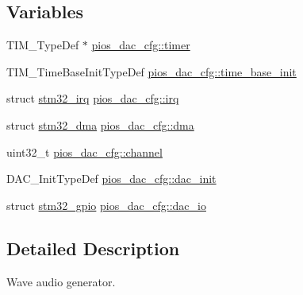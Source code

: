 \subsection*{\-Variables}
\begin{DoxyCompactItemize}
\item 
\-T\-I\-M\-\_\-\-Type\-Def $\ast$ \hyperlink{group___p_i_o_s___w_a_v_p_l_a_y_ga06b2a838489fd6bb8f48615002e024d8}{pios\-\_\-dac\-\_\-cfg\-::timer}
\item 
\-T\-I\-M\-\_\-\-Time\-Base\-Init\-Type\-Def \hyperlink{group___p_i_o_s___w_a_v_p_l_a_y_ga1568b0926bb1e178d06682a8495e0f40}{pios\-\_\-dac\-\_\-cfg\-::time\-\_\-base\-\_\-init}
\item 
struct \hyperlink{structstm32__irq}{stm32\-\_\-irq} \hyperlink{group___p_i_o_s___w_a_v_p_l_a_y_ga1db4430fc674d954d396ce5abf14307c}{pios\-\_\-dac\-\_\-cfg\-::irq}
\item 
struct \hyperlink{structstm32__dma}{stm32\-\_\-dma} \hyperlink{group___p_i_o_s___w_a_v_p_l_a_y_ga9794db8fe6627bb998ba905f5ec5b869}{pios\-\_\-dac\-\_\-cfg\-::dma}
\item 
uint32\-\_\-t \hyperlink{group___p_i_o_s___w_a_v_p_l_a_y_ga197e2e3664b092f223251af8db017392}{pios\-\_\-dac\-\_\-cfg\-::channel}
\item 
\-D\-A\-C\-\_\-\-Init\-Type\-Def \hyperlink{group___p_i_o_s___w_a_v_p_l_a_y_ga2da6286f80191750fd6960a67d4a1e20}{pios\-\_\-dac\-\_\-cfg\-::dac\-\_\-init}
\item 
struct \hyperlink{structstm32__gpio}{stm32\-\_\-gpio} \hyperlink{group___p_i_o_s___w_a_v_p_l_a_y_gae02d1c0fa0764b2cf3172a8d3582295f}{pios\-\_\-dac\-\_\-cfg\-::dac\-\_\-io}
\end{DoxyCompactItemize}


\subsection{\-Detailed \-Description}
\-Wave audio generator. 

